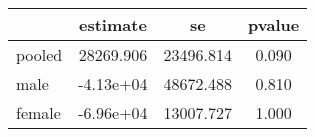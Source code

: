 \begin{table}[htbp]
\begin{tabular}{lccc} \hline \hline
 & estimate  & se  & pvalue  \\  \hline 
pooled & 28269.906 & 23496.814 &     0.090 \\  
male & -4.13e+04 & 48672.488 &     0.810 \\  
female & -6.96e+04 & 13007.727 &     1.000 \\  
\hline \hline \end{tabular}
\end{table}
